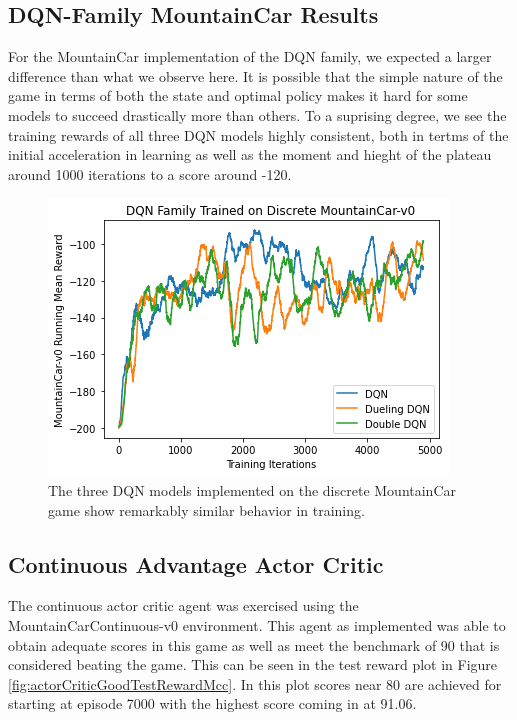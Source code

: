 \documentclass[conference]{IEEEtran}
\begin{document}
\subsection{DQN-Family MountainCar Results}
For the MountainCar implementation of the DQN family, we expected a larger difference than what we observe here. It is possible that the simple nature of the game in terms of both the state and optimal policy makes it hard for some models to succeed drastically more than others. To a suprising degree, we see the training rewards of all three DQN models highly consistent, both in tertms of the initial acceleration in learning as well as the moment and hieght of the plateau around 1000 iterations to a score around -120.

\begin{figure}
\centerline{\includegraphics[scale=0.6]{DQN_family_car.png}}
\caption{The three DQN models implemented on the discrete MountainCar game show remarkably similar behavior in training.}
\end{figure}

\subsection{Continuous Advantage Actor Critic}
The continuous actor critic agent was exercised using the MountainCarContinuous-v0 environment.
This agent as implemented was able to obtain adequate scores in this game as well as meet the benchmark of 90 that is considered beating the game.
This can be seen in the test reward plot in Figure \ref{fig:actorCriticGoodTestRewardMcc}.
In this plot scores near 80 are achieved for starting at episode 7000 with the highest score coming in at 91.06.
\end{document}
